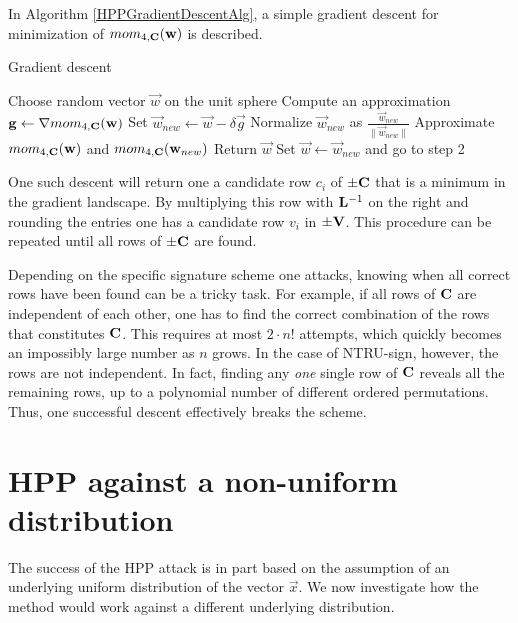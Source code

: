In Algorithm \ref{HPPGradientDescentAlg}, a simple gradient descent for minimization of $mom_{4, \mathbf{C}}(\mathbf{w})$ is described.
\begin{algorithm}
    \caption{Gradient descent}\label{HPPGradientDescentAlg}
\begin{algorithmic}[1]
        \State Choose random vector $\vec{w}$ on the unit sphere
        \State Compute an approximation $\mathbf{g} \gets \nabla mom_{4, \mathbf{C}}(\mathbf{w})$
        \State Set $\vec{w}_{new} \gets \vec{w} - \delta \vec{g} $
        \State Normalize $\vec{w}_{new}$ as $\frac{\vec{w}_{new}}{\lVert \vec{w}_{new} \rVert}$
        \State Approximate $mom_{4, \mathbf{C}}(\mathbf{w})$ and $mom_{4, \mathbf{C}}(\mathbf{w}_{new})$
            \State Return $\vec{w}$
        \Else{}
        \State Set $\vec{w} \gets \vec{w}_{new}$ and go to step 2
        \EndIf
\end{algorithmic}
\end{algorithm}
One such descent will return one a candidate row $c_i$ of $\pm \mathbf{C}$ that is a minimum in the gradient landscape.
By multiplying this row with $\mathbf{L}^{-1}$ on the right and rounding the entries one has a candidate row $v_i$ in $\pm \mathbf{V}$.
This procedure can be repeated until all rows of $\pm \mathbf{C}$ are found. 

Depending on the specific signature scheme one attacks, knowing when
all correct rows have been found can be a tricky task. For example, if all rows of $\mathbf{C}$ are independent of each other, one 
has to find the correct combination of the rows that constitutes $\mathbf{C}$. This requires at most $2 \cdot n!$ attempts, which quickly becomes an impossibly large number as $n$ grows. 
In the case of NTRU-sign, however, the rows are not independent. In fact, finding any \textit{one} single row of $\mathbf{C}$ reveals all the remaining rows,
up to a polynomial number of different ordered permutations. Thus, one successful descent effectively breaks the scheme.


\section{HPP against a non-uniform distribution}
The success of the HPP attack is in part based on the assumption of an underlying uniform distribution of the vector $\vec{x}$.
We now investigate how the method would work against a different underlying distribution.

